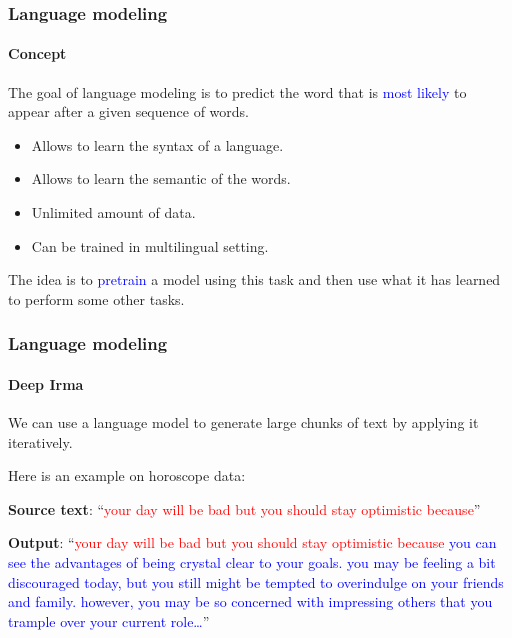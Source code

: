 \documentclass[9pt]{beamer}
\begin{document}
\begin{frame}

  \frametitle{Language modeling}

  \framesubtitle{Concept}

  The goal of language modeling is to predict the word that is
  \textcolor{blue}{most likely} to appear after a given sequence of
  words.

  \begin{figure}
    \scalebox{0.7}{
      
    }
  \end{figure}

  \begin{itemize}
  \item Allows to learn the syntax of a language.
  \item Allows to learn the semantic of the words.
  \item Unlimited amount of data.
  \item Can be trained in multilingual setting.
  \end{itemize}

  \medskip

  The idea is to \textcolor{blue}{pretrain} a model using this task
  and then use what it has learned to perform some other tasks.
\end{frame}

\begin{frame}
  \frametitle{Language modeling}

  \framesubtitle{Deep Irma}

  We can use a language model to generate large chunks of text by
  applying it iteratively.

  \bigskip

  Here is an example on horoscope data:

  \vspace{1cm}

  \textbf{Source text}: ``\textcolor{red}{your day will be bad but you
    should stay optimistic because}''

  \vspace{1cm}

  \textbf{Output}: ``\textcolor{red}{your day will be bad but you
    should stay optimistic because} \textcolor{blue}{you can see the
    advantages of being crystal clear to your goals. you may be
    feeling a bit discouraged today, but you still might be tempted to
    overindulge on your friends and family. however, you may be so
    concerned with impressing others that you trample over your
    current role\dots}''

\end{frame}
\end{document}
